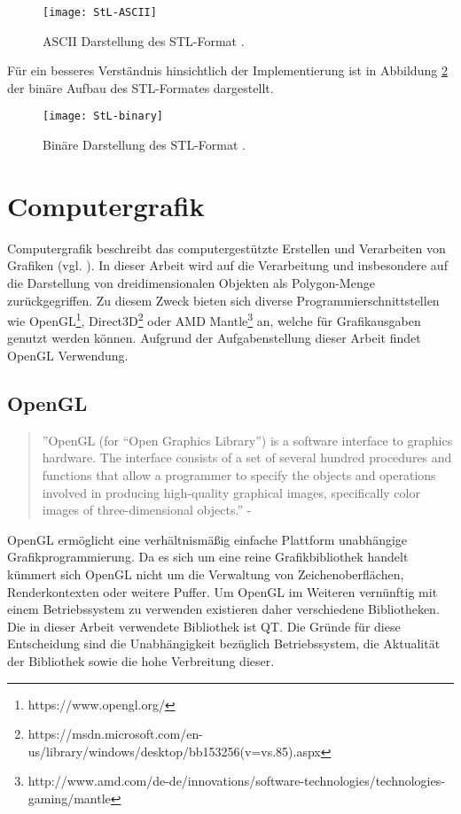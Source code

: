 \begin{figure}[H]
	\centering
	\texttt{[image: StL-ASCII]}
	\caption{ASCII Darstellung des STL-Format \citep{STLFormat}.}
	\label{fig:ASCIISTL}
\end{figure}
\noindent Für ein besseres Verständnis hinsichtlich der Implementierung ist in Abbildung \ref{fig:BINARYSTL} der binäre Aufbau des STL-Formates dargestellt. 
\begin{figure}
	\centering
	\texttt{[image: StL-binary]}
	\caption{Binäre Darstellung des STL-Format \citep{STLFormat}.}
	\label{fig:BINARYSTL}
\end{figure}

\section{Computergrafik}
Computergrafik beschreibt das computergestützte Erstellen und Verarbeiten von Grafiken (vgl. \citep{ComputerGraphics}). In dieser Arbeit wird auf die Verarbeitung und insbesondere auf die Darstellung von dreidimensionalen Objekten als Polygon-Menge zurückgegriffen. Zu diesem Zweck bieten sich diverse Programmierschnittstellen wie OpenGL\footnote{https://www.opengl.org/}, Direct3D\footnote{https://msdn.microsoft.com/en-us/library/windows/desktop/bb153256(v=vs.85).aspx} oder AMD Mantle\footnote{http://www.amd.com/de-de/innovations/software-technologies/technologies-gaming/mantle} an, welche für Grafikausgaben genutzt werden können. Aufgrund der Aufgabenstellung dieser Arbeit findet OpenGL Verwendung.
\subsection{OpenGL}
\begin{quote}
	''OpenGL (for “Open Graphics Library”) is a software interface to graphics hardware.
	The interface consists of a set of several hundred procedures and functions
	that allow a programmer to specify the objects and operations involved in producing
	high-quality graphical images, specifically color images of three-dimensional
	objects.'' - \citep{OpenGLDoku}
\end{quote}
OpenGL ermöglicht eine verhältnismäßig einfache Plattform unabhängige Grafikprogrammierung. Da es sich um eine reine Grafikbibliothek handelt kümmert sich OpenGL nicht um die Verwaltung von Zeichenoberflächen, Renderkontexten oder weitere Puffer. Um OpenGL im Weiteren vernünftig mit einem Betriebssystem zu verwenden existieren daher verschiedene Bibliotheken. Die in dieser Arbeit verwendete Bibliothek ist QT. Die Gründe für diese Entscheidung sind die Unabhängigkeit bezüglich Betriebssystem, die Aktualität der Bibliothek sowie die hohe Verbreitung dieser.